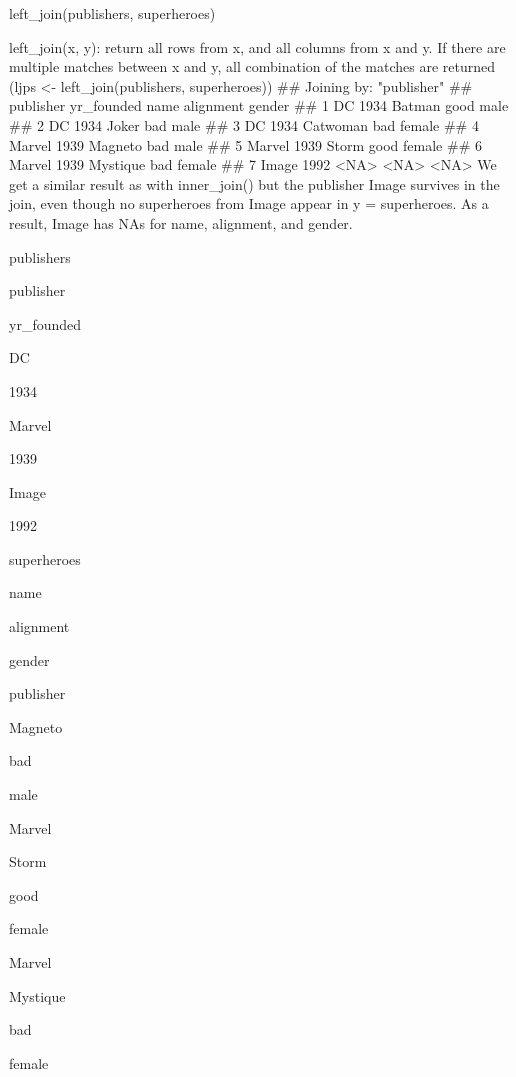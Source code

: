 left_join(publishers, superheroes)
 

left_join(x, y): return all rows from x, and all columns from x and y. If there are multiple matches between x and y, all combination of the matches are returned
 (ljps <- left_join(publishers, superheroes)) ## Joining by: "publisher" ##   publisher yr_founded     name alignment gender
## 1        DC       1934   Batman      good   male
## 2        DC       1934    Joker       bad   male
## 3        DC       1934 Catwoman       bad female
## 4    Marvel       1939  Magneto       bad   male
## 5    Marvel       1939    Storm      good female
## 6    Marvel       1939 Mystique       bad female
## 7     Image       1992     <NA>      <NA>   <NA> 
We get a similar result as with inner_join() but the publisher Image survives in the join, even though no superheroes from Image appear in y = superheroes. As a result, Image has NAs for name, alignment, and gender.
 



publishers
 


publisher
 
yr_founded
 



DC
 
1934
 


Marvel
 
1939
 


Image
 
1992
 


superheroes
 


name
 
alignment
 
gender
 
publisher
 



Magneto
 
bad
 
male
 
Marvel
 


Storm
 
good
 
female
 
Marvel
 


Mystique
 
bad
 
female
 

